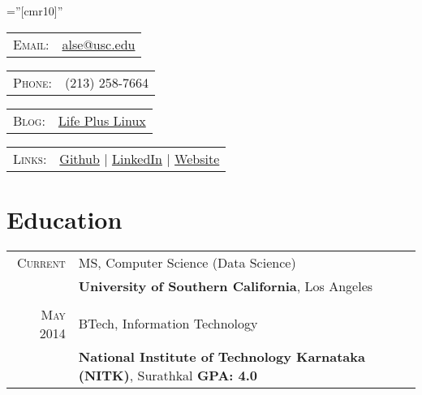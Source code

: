 \documentclass[a4paper,10pt]{article} %
\begin{document}
\pagestyle{empty} %

\font\fb=''[cmr10]'' %


\par{\bigskip\par} %

\begin{tabular}{rl}
\textsc{Email:} & \href{mailto:alse@usc.edu}{alse@usc.edu}\\
\end{tabular}
\hfill
\begin{tabular}{rl}
\textsc{Phone:} & (213) 258-7664\\
\end{tabular}
\hfill
\begin{tabular}{rl}
\textsc{Blog:} & \href{http://lifepluslinux.blogspot.in}{Life Plus Linux}
\end{tabular}

\begin{tabular}{rl}
\textsc{Links:} & \href{http://github.com/alseambusher}{Github} | \href{http://in.linkedin.com/pub/suresh-alse/4a/956/682}{LinkedIn} | \href{http://alseambusher.github.io}{Website} 
\end{tabular}


\section{Education}
\renewcommand{\arraystretch}{0.98}%
\begin{tabular}{rl}	

\textsc{Current} & MS, Computer Science (Data Science)\\
&\textbf{University of Southern California}, Los Angeles\\
\\

\textsc{May} 2014 & BTech, Information Technology\\
&\textbf{National Institute of Technology Karnataka (NITK)}, Surathkal \hspace{.8cm} \textbf{GPA: 4.0}

\end{tabular}
\end{document}
